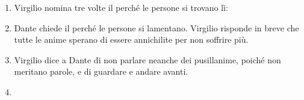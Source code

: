 \documentclass{article}
\begin{document}
\begin{enumerate}
{    né lo profondo inferno li riceve, \\ 
    ch'alcuna gloria i rei avrebber d'elli.
    }
    Gli angeli cacciati dal cielo non sono ricevuti dall'Inferno profondo, poiché i dannati potrebbero vantarsi di condividere la pena con un angelo.
    \item Virgilio nomina tre volte il perché le persone si trovano lì: 
    \item 
    Dante chiede il perché le persone si lamentano. Virgilio risponde in breve che tutte le anime sperano di essere annichilite per non soffrire più.
    \item 
    Virgilio dice a Dante di non parlare neanche dei pusillanime, poiché non meritano parole, e di guardare e andare avanti.
    \item 
\end{enumerate}
\end{document}
